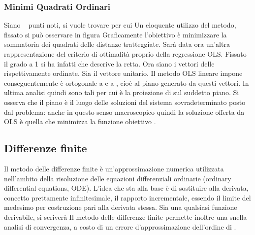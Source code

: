 	\subsubsection{Minimi Quadrati Ordinari} %
Siano   ~ punti noti, si vuole trovare  per cui  Un eloquente utilizzo del metodo, fissato  si può osservare in figura 
Graficamente l'obiettivo è minimizzare la sommatoria dei quadrati delle distanze tratteggiate. Sarà data ora un'altra rappresentazione del criterio di ottimalità proprio della regressione OLS. Fissato il grado a 1 si ha infatti  che descrive la retta. Ora siano  i vettori delle  rispettivamente ordinate. Sia  il vettore unitario. 
Il metodo OLS lineare impone 
conseguentemente  è ortogonale a  e a , cioè al piano generato da questi vettori. In ultima analisi quindi  sono tali per cui  è la proiezione di  sul suddetto piano. Si osserva che il piano è il luogo delle  soluzioni del sistema sovradeterminato posto dal problema: anche in questo senso macroscopico quindi la soluzione offerta da OLS è quella che minimizza la funzione obiettivo \cite{OLSFIT}. 
\subsection{Differenze finite} %
Il metodo delle differenze finite è un'approssimazione numerica utilizzata nell'ambito della risoluzione delle equazioni differenziali ordinarie (ordinary differential equations, ODE).
L'idea che sta alla base è di sostituire alla derivata, concetto prettamente infinitesimale, il rapporto incrementale, essendo il limite del medesimo per costruzione pari alla derivata stessa. Sia  una qualsiasi funzione derivabile,  si scriverà 
Il metodo delle differenze finite permette inoltre una snella analisi di convergenza, a costo di un errore d'approssimazione dell'ordine di .
